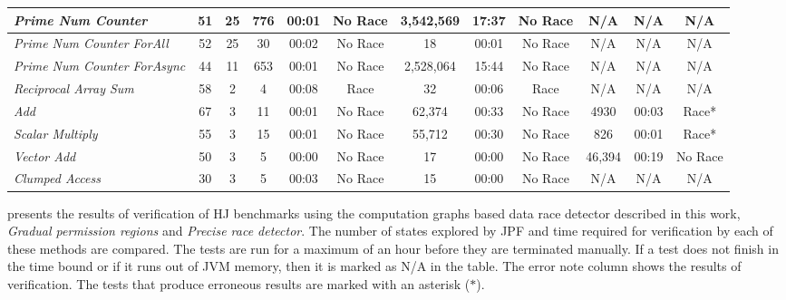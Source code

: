 \begin{table*}
{\begin{tabular}{|m{3.5cm}|c|c|c|c|c|c|c|c|c|c|c|}
\textit{Prime Num Counter} & 51 & 25
& 776 & 00:01 & No Race
& 3,542,569 & 17:37 & No Race 
& N/A & N/A & N/A \\ \hline

\textit{Prime Num  Counter ForAll}  & 52 & 25
& 30 & 00:02 & No Race
& 18 & 00:01 & No Race
& N/A & N/A & N/A \\ \hline

\textit{Prime Num Counter ForAsync}  & 44 & 11 
& 653 & 00:01 & No Race
& 2,528,064 & 15:44 & No Race 
& N/A & N/A & N/A \\ \hline

\textit{Reciprocal Array Sum} & 58 & 2
& 4 & 00:08 & Race
& 32 & 00:06 & Race
& N/A & N/A & N/A \\ \hline

\textit{Add}  & 67 & 3 
& 11 & 00:01 & No Race 
& 62,374 & 00:33 & No Race
& 4930 & 00:03 & Race* \\ \hline

\textit{Scalar Multiply}  & 55 & 3 
& 15 & 00:01 & No Race
& 55,712 & 00:30 & No Race 
& 826 & 00:01 & Race* \\ \hline

\textit{Vector Add} & 50 & 3 
& 5 & 00:00 & No Race
& 17 & 00:00 & No Race 
& 46,394 & 00:19 & No Race \\ \hline

\textit{Clumped Access}  & 30 & 3 
& 5 & 00:03 & No Race
& 15 & 00:00 & No Race 
& N/A & N/A & N/A \\ \hline

\end{tabular}}
\vspace{-1em}
\end{table*}

 presents the results of verification of HJ benchmarks using the computation graphs based data race detector described in this work, \textit{Gradual permission regions} and \textit{Precise race detector}. The number of states explored by JPF and time required for verification by each of these methods are compared. The tests are run for a maximum of an hour before they are terminated manually. If a test does not finish in the time bound or if it runs out of JVM memory, then it is marked as N/A in the table. The error note column shows the results of verification. The tests that produce erroneous results are marked with an asterisk ($\ast$). 

